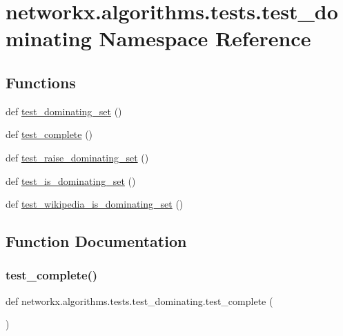 \hypertarget{namespacenetworkx_1_1algorithms_1_1tests_1_1test__dominating}{}\section{networkx.\+algorithms.\+tests.\+test\+\_\+dominating Namespace Reference}
\label{namespacenetworkx_1_1algorithms_1_1tests_1_1test__dominating}
\subsection*{Functions}
\begin{DoxyCompactItemize}
\item 
def \hyperlink{namespacenetworkx_1_1algorithms_1_1tests_1_1test__dominating_a55d6b72cf6bc696886642a2b4bfc5444}{test\+\_\+dominating\+\_\+set} ()
\item 
def \hyperlink{namespacenetworkx_1_1algorithms_1_1tests_1_1test__dominating_aff071628d655b92013fb29820e4b26d7}{test\+\_\+complete} ()
\item 
def \hyperlink{namespacenetworkx_1_1algorithms_1_1tests_1_1test__dominating_ad609df289a87c130b92def44acb921f1}{test\+\_\+raise\+\_\+dominating\+\_\+set} ()
\item 
def \hyperlink{namespacenetworkx_1_1algorithms_1_1tests_1_1test__dominating_a6891dcde25ad1f145ccc0b42906c303d}{test\+\_\+is\+\_\+dominating\+\_\+set} ()
\item 
def \hyperlink{namespacenetworkx_1_1algorithms_1_1tests_1_1test__dominating_a76f967b692bc17989b832a5759585b69}{test\+\_\+wikipedia\+\_\+is\+\_\+dominating\+\_\+set} ()
\end{DoxyCompactItemize}


\subsection{Function Documentation}
\mbox{\label{namespacenetworkx_1_1algorithms_1_1tests_1_1test__dominating_aff071628d655b92013fb29820e4b26d7}} 
\subsubsection{\texorpdfstring{test\+\_\+complete()}{test\_complete()}}
{\footnotesize\ttfamily def networkx.\+algorithms.\+tests.\+test\+\_\+dominating.\+test\+\_\+complete (\begin{DoxyParamCaption}{ }\end{DoxyParamCaption})}

